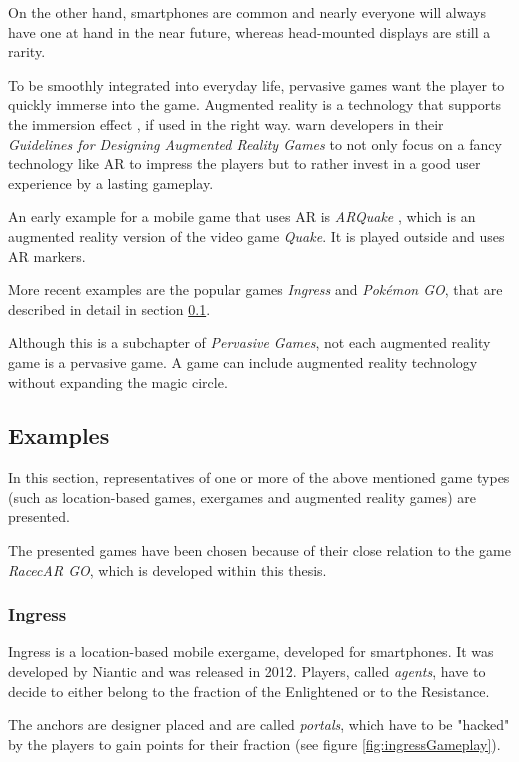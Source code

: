 On the other hand, smartphones are common and nearly everyone will always have one at hand in the near future, whereas head-mounted displays are still a rarity.

To be smoothly integrated into everyday life, pervasive games want the player to quickly immerse into the game. Augmented reality is a technology that supports the immersion effect \citep{waern2009three}, if used in the right way. \citeauthor{wetzel2008guidelines} warn developers in their \emph{Guidelines for Designing Augmented Reality Games} \citep{wetzel2008guidelines} to not only focus on a fancy technology like AR to impress the players but to rather invest in a good user experience by a lasting gameplay.

An early example for a mobile game that uses AR is \emph{ARQuake} \citep{piekarski2002arquake}, which is an augmented reality version of the video game \emph{Quake}. It is played outside and uses AR markers.

More recent examples are the popular games \emph{Ingress} and \emph{Pok\'{e}mon GO}, that are described in detail in section \ref{sec:examples}.

Although this is a subchapter of \emph{Pervasive Games}, not each augmented reality game is a pervasive game. A game can include augmented reality technology without expanding the magic circle.

\subsection{Examples}\label{sec:examples}
In this section, representatives of one or more of the above mentioned game types (such as location-based games, exergames and augmented reality games) are presented.

The presented games have been chosen because of their close relation to the game \emph{RacecAR GO}, which is developed within this thesis.

\subsubsection{Ingress}
Ingress is a location-based mobile exergame, developed for smartphones. It was developed by Niantic and was released in 2012. Players, called \emph{agents}, have to decide to either belong to the fraction of the Enlightened or to the Resistance.

The anchors are designer placed and are called \emph{portals}, which have to be "hacked" by the players to gain points for their fraction (see figure \ref{fig:ingressGameplay}).

